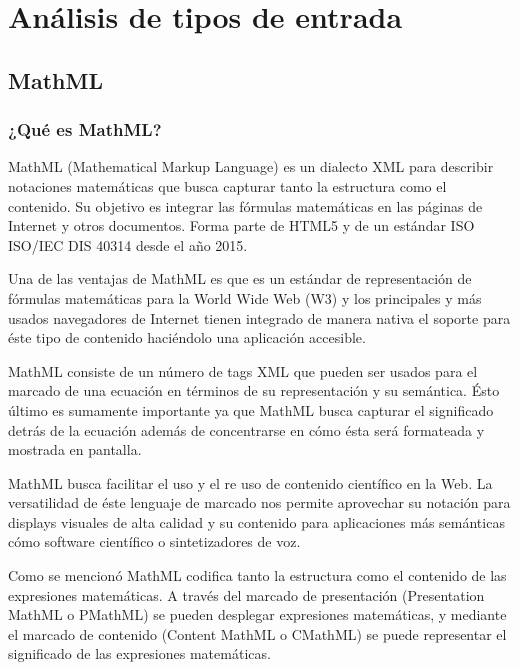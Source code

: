 
\chapter{Análisis de tipos de entrada}

\label{Chapter2} %


\section{MathML}


\subsection{¿Qué es MathML?}

MathML (Mathematical Markup Language) \cite{2} es un dialecto XML para describir notaciones matemáticas que busca capturar tanto la estructura
como el contenido. Su objetivo es integrar las fórmulas matemáticas en las páginas de Internet y otros documentos.
Forma parte de HTML5 y de un estándar ISO ISO/IEC DIS 40314 desde el año 2015.

Una de las ventajas de MathML es que es un estándar de representación de fórmulas matemáticas para la World Wide Web (W3) y los principales y más usados
navegadores de Internet tienen integrado de manera nativa el soporte para éste tipo de contenido haciéndolo una aplicación accesible.

MathML consiste de un número de tags XML que pueden ser usados
para el marcado de una ecuación en términos de su representación y su semántica. Ésto último es sumamente importante
ya que MathML busca capturar el significado detrás de la ecuación además de concentrarse en cómo ésta será formateada y mostrada en pantalla.

MathML busca facilitar el uso y el re uso de contenido científico en la Web. La versatilidad de éste lenguaje de marcado nos permite aprovechar
su notación para displays visuales de alta calidad y su contenido para aplicaciones más semánticas cómo software científico o sintetizadores de voz.

Como se mencionó MathML codifica tanto la estructura como el contenido de las expresiones matemáticas.
A través del marcado de presentación (Presentation MathML o PMathML) se pueden desplegar expresiones matemáticas, y mediante el marcado de contenido
(Content MathML o CMathML) se puede representar el significado de las expresiones matemáticas.

